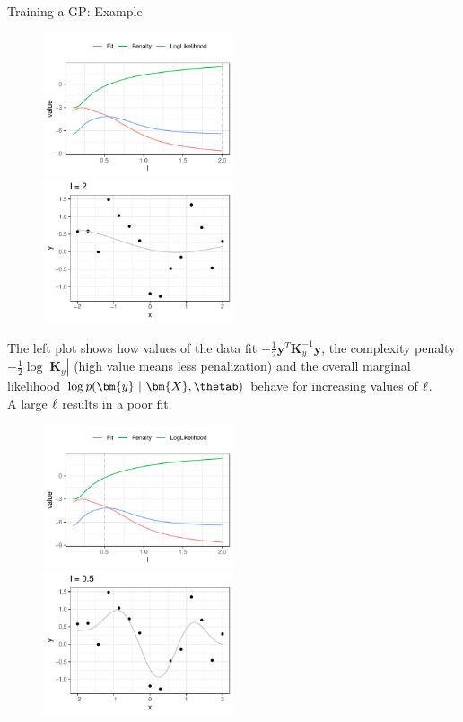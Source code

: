\begin{vbframe}{Training a GP: Example}
\begin{figure}
	\includegraphics[width = 0.5\textwidth]{figure_man/training/fit-vs-penalty-2.pdf}~	\includegraphics[width = 0.5\textwidth]{figure_man/training/datapoints-2.pdf}
\end{figure}

\begin{footnotesize}
	The left plot shows how values of the data fit $-\frac{1}{2}\bm{y}^T\bm{K}_y^{-1} \bm{y}$, the complexity penalty $- \frac{1}{2} \log \left| \bm{K}_y \right|$ (high value means less penalization) and the overall marginal likelihood $\log p(\bm{y} ~|~ \bm{X}, \thetab)$ behave for increasing values of $\ell$.\\ 
	A large $\ell$ results in a poor fit. 
\end{footnotesize}

\framebreak 

\begin{figure}
	\includegraphics[width = 0.5\textwidth]{figure_man/training/fit-vs-penalty-0_5.pdf}~	\includegraphics[width = 0.5\textwidth]{figure_man/training/datapoints-0_5.pdf}
\end{figure}


\end{vbframe}
